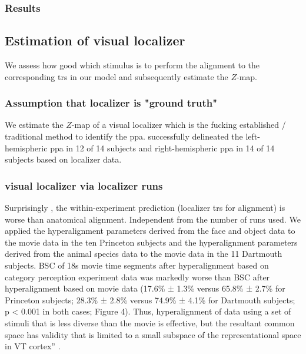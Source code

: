 

\subsubsection{Results}







\subsection{Estimation of visual localizer}

We assess how good which stimulus is to perform the alignment to the
corresponding \acp{tr} in our model and subsequently estimate the $Z$-map.


\subsubsection{Assumption that localizer is "ground truth"}

We estimate the $Z$-map of a visual localizer which is the fucking established /
traditional method to identify the \ac{ppa}.
%
\citet{sengupta2016extension} successfully delineated the left-hemispheric
\ac{ppa} in 12 of 14 subjects and right-hemispheric \ac{ppa} in 14 of 14
subjects based on localizer data.


\subsubsection{visual localizer via localizer runs}


Surprisingly \citep[cf.][]{haxby2011common}, the within-experiment prediction
(localizer \acp{tr} for alignment) is worse than anatomical alignment.
%
Independent from the number of runs used.
%
We applied the hyperalignment parameters derived from the face and object data
to the movie data in the ten Princeton subjects and the hyperalignment
parameters derived from the animal species data to the movie data in the 11
Dartmouth subjects.
%
BSC of 18s movie time segments after hyperalignment based on category perception
experiment data was markedly worse than BSC after hyperalignment based on movie
data (17.6\% ± 1.3\% versus 65.8\% ± 2.7\% for Princeton subjects; 28.3\% ±
2.8\% versus 74.9\% ± 4.1\% for Dartmouth subjects; p < 0.001 in both cases;
Figure 4).
%
Thus, hyperalignment of data using a set of stimuli that is less diverse than
the movie is effective, but the resultant common space has validity that is
limited to a small subspace of the representational space in VT cortex''
\citep{haxby2011common}.


